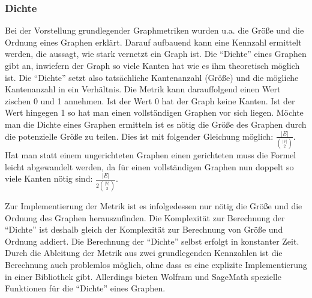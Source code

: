 \documentclass[a4paper,12pt,ngerman,chapterprefix=false,listof=totoc,bibliography=totoc]{scrreprt}
\begin{document}
\subsubsection*{Dichte}
{
Bei der Vorstellung grundlegender Graphmetriken wurden u.a. die Größe und die Ordnung eines Graphen erklärt. Darauf aufbauend kann eine Kennzahl ermittelt werden, die aussagt, wie stark vernetzt ein Graph ist. Die "`Dichte"' eines Graphen gibt an, inwiefern der Graph so viele Kanten hat wie es ihm theoretisch möglich ist. Die "`Dichte"' setzt also tatsächliche Kantenanzahl (Größe) und die mögliche Kantenanzahl in ein Verhältnis. Die Metrik kann darauffolgend einen Wert zischen 0 und 1 annehmen. Ist der Wert 0 hat der Graph keine Kanten. Ist der Wert hingegen 1 so hat man einen vollständigen Graphen vor sich liegen. Möchte man die Dichte eines Graphen ermitteln ist es nötig die Größe des Graphen durch die potenzielle Größe zu teilen. Dies ist mit folgender Gleichung möglich: \(\frac{\vert E\vert}{\binom{\vert V\vert}{2}}\). Hat man statt einem ungerichteten Graphen einen gerichteten muss die Formel leicht abgewandelt werden, da für einen vollständigen Graphen nun doppelt so viele Kanten nötig sind: \(\frac{\vert E\vert}{2\binom{\vert V\vert}{2}}\). \cite{sagemath_graph_2020}

Zur Implementierung der Metrik ist es infolgedessen nur nötig die Größe und die Ordnung des Graphen herauszufinden. Die Komplexität zur Berechnung der "`Dichte"' ist deshalb gleich der Komplexität zur Berechnung von Größe und Ordnung addiert. Die Berechnung der "`Dichte"' selbst erfolgt in konstanter Zeit. Durch die Ableitung der Metrik aus zwei grundlegenden Kennzahlen ist die Berechnung auch problemlos möglich, ohne dass es eine explizite Implementierung in einer Bibliothek gibt. Allerdings bieten Wolfram und SageMath spezielle Funktionen für die "`Dichte"' eines Graphen. \cite{sagemath_graph_2020,wolfram_wolfram_2020,matlab_directed_2020}
}
\end{document}
